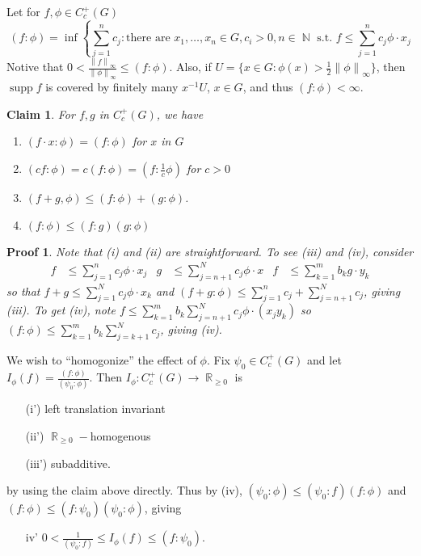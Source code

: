 \documentclass[11pt, a4paper]{memoir}
\DeclareMathOperator{\N}{{\mathbb{N}}}
\DeclareMathOperator{\R}{{\mathbb{R}}}
\newcommand{\norm}[1]{\ensuremath{\left\lVert#1\right\rVert}}
\theoremstyle{change}
\theoremstyle{plain}
\newtheorem{claim}{Claim}
\theoremstyle{nonumberplain}
\newtheorem{nmproof}{Proof}
\DeclareMathOperator{\supp}{supp}
\numberwithin{equation}{section}
\begin{document}
Let for $f,\phi\in C_c^+(G)$
\begin{equation*}
    (f:\phi)=\inf\left\{\sum_{j=1}^n c_j:\text{there are }x_1,\ldots,x_n\in G,c_i>0,n\in\N \text{ s.t. }f\leq\sum_{j=1}^n c_j\phi\cdot x_j
\end{equation*}
Notive that $0<\frac{\norm{f}_\infty}{\norm{\phi}_\infty}\leq(f:\phi)$.
Also, if $U=\{x\in G:\phi(x)>\frac{1}{2}\norm{\phi}_\infty\}$, then $\supp f$ is covered by finitely many $x^{-1}U$, $x\in G$, and thus $(f:\phi)<\infty$.
\begin{claim}
    For $f,g$ in $C_c^+(G)$, we have
    \begin{enumerate}[nl,r]
        \item $(f\cdot x:\phi)=(f:\phi)$ for $x$ in $G$
        \item $(cf:\phi)=c(f:\phi)=(f:\frac{1}{c}\phi)$ for $c>0$
        \item $(f+g,\phi)\leq (f:\phi)+(g:\phi)$.
        \item $(f:\phi)\leq (f:g)(g:\phi)$
    \end{enumerate}
\end{claim}
\begin{nmproof}
    Note that (i) and (ii) are straightforward.
    To see (iii) and (iv), consider
    \begin{align*}
        f&\leq\sum_{j=1}^n c_j\phi\cdot x_j & g&\leq\sum_{j=n+1}^Nc_j\phi\cdot x & f&\leq\sum_{k=1}^m b_kg\cdot y_k
    \end{align*}
    so that $f+g\leq\sum_{j=1}^Nc_j\phi\cdot x_k$ and $(f+g:\phi)\leq\sum_{j=1}^n c_j+\sum_{j=n+1}^N c_j$, giving (iii).
    To get (iv), note $f\leq\sum_{k=1}^m b_k\sum_{j=n+1}^N c_j\phi\cdot(x_jy_k)$ so $(f:\phi)\leq\sum_{k=1}^m b_k\sum_{j=k+1}^Nc_j$, giving (iv).
\end{nmproof}
We wish to ``homogonize'' the effect of $\phi$.
Fix $\psi_0\in C_c^+(G)$ and let $I_\phi(f)=\frac{(f:\phi)}{(\psi_0:\phi)}$.
Then $I_\phi:C_c^+(G)\to\R_{\geq 0}$ is
\begin{enumerate}[nl]
    \item[(i')] left translation invariant
    \item[(ii')] $\R_{\geq 0}-$homogenous
    \item[(iii')] subadditive.
\end{enumerate}
by using the claim above directly.
Thus by (iv), $(\psi_0:\phi)\leq(\psi_0:f)(f:\phi)$ and $(f:\phi)\leq(f:\psi_0)(\psi_0:\phi)$, giving
\begin{enumerate}[nl]
    \item[iv'] $0<\frac{1}{(\psi_0:f)}\leq I_\phi(f)\leq (f:\psi_0)$.
\end{enumerate}
\end{document}
